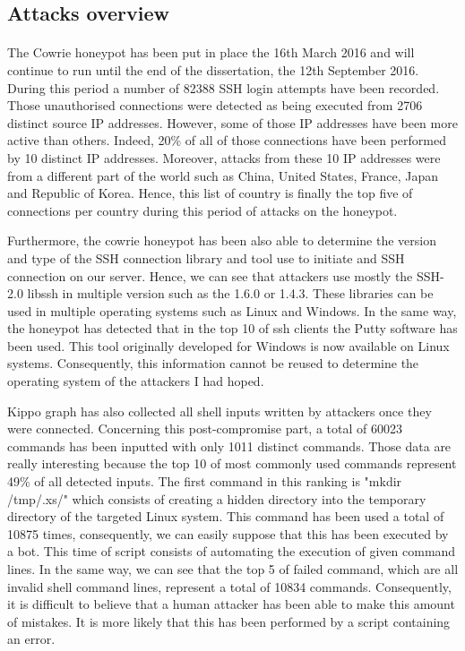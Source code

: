 \subsection{Attacks overview}

\paragraph{} %

The Cowrie honeypot has been put in place the 16th March 2016 and will continue to run
until the end of the dissertation, the 12th September 2016. During this period a number
of 82388 SSH login attempts have been recorded. Those unauthorised connections were detected
as being executed from 2706 distinct source IP addresses. However, some of those IP addresses
have been more active than others. Indeed, 20\% of all of those connections have been performed
by 10 distinct IP addresses. Moreover, attacks from these 10 IP addresses were from a different
part of the world such as China, United States, France, Japan and Republic of Korea.
Hence, this list of country is finally the top five of connections per country during this
period of attacks on the honeypot.

Furthermore, the cowrie honeypot has been also able to determine the version and type of the
SSH connection library and tool use to initiate and SSH connection on our server.
Hence, we can see that attackers use mostly the SSH-2.0 libssh in multiple version such as
the 1.6.0 or 1.4.3. These libraries can be used in multiple operating systems such as
Linux and Windows. In the same way, the honeypot has detected that in the top 10 of ssh clients
the Putty software has been used. This tool originally developed for Windows is now available
on Linux systems. Consequently, this information cannot be reused to determine the operating
system of the attackers I had hoped.

Kippo graph has also collected all shell inputs written by attackers once they were connected.
Concerning this post-compromise part, a total of 60023 commands has been inputted with
only 1011 distinct commands. Those data are really interesting because the top 10 of most
commonly used commands represent 49\% of all detected inputs. The first command in this
ranking is "mkdir /tmp/.xs/" which consists of creating a hidden directory into the temporary directory of the targeted Linux system. This command has been used a total of 10875 times,
consequently, we can easily suppose that this has been executed by a bot. This time of script
consists of automating the execution of given command lines. In the same way, we can see that
the top 5 of failed command, which are all invalid shell command lines, represent a total
of 10834 commands. Consequently, it is difficult to believe that a human attacker has been
able to make this amount of mistakes. It is more likely that this has been performed by a
script containing an error.

